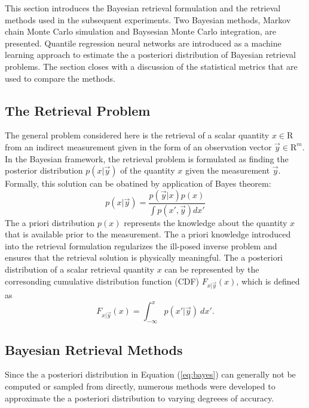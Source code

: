 \documentclass[journal abbreviation, manuscript]{copernicus}
\begin{document}
This section introduces the Bayesian retrieval formulation and the retrieval
methods used in the subsequent experiments. Two Bayesian methods, Markov chain
Monte Carlo simulation and Baysesian Monte Carlo integration, are presented.
Quantile regression neural networks are introduced as a machine learning
approach to estimate the a posteriori distribution of Bayesian retrieval
problems. The section closes with a discussion of the statistical metrics that
are used to compare the methods.

\subsection{The Retrieval Problem}

The general problem considered here is the retrieval of a scalar quantity $x \in
\mathrm{R}$ from an indirect measurement given in the form of an observation
vector $\vec{y} \in \mathrm{R}^m$. In the Bayesian framework, the retrieval
problem is formulated as finding the posterior distribution $p(x | \vec{y})$ of
the quantity $x$ given the measurement $\vec{y}$. Formally, this solution can be
obatined by application of Bayes theorem:
\begin{equation}\label{eq:bayes}
  p(x | \vec{y}) = \frac{p(\vec{y} | x)p(x)}{\int p(x', \vec{y}) dx'}
\end{equation}
The a priori distribution $p(x)$ represents the knowledge about the quantity $x$
that is available prior to the measurement. The a priori knowledge introduced
into the retrieval formulation regularizes the ill-posed inverse problem and
ensures that the retrieval solution is physically meaningful. The a posteriori
distribution of a scalar retrieval quantity $x$ can be represented by the
corresonding cumulative distribution function (CDF) $F_{x | \vec{y}}(x)$,
which is defined as 
\begin{equation}\label{eq:cdf}
F_{x | \vec{y}}(x) = \int_{-\infty}^{x} p(x' | \vec{y}) \: dx'.
\end{equation}

\subsection{Bayesian Retrieval Methods}

Since the a posteriori distribution in Equation (\ref{eq:bayes}) can generally not
be computed or sampled from directly, numerous methods were developed to approximate
 the a posteriori distribution to varying degreees of accuracy. 
\end{document}
